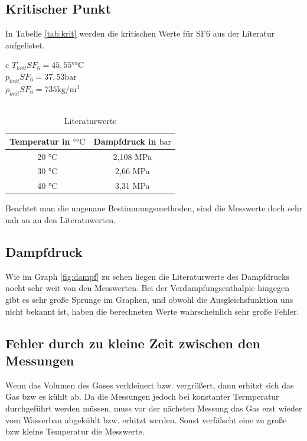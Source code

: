 \documentclass[11pt, a4paper]{article}
\begin{document}
    \subsection{Kritischer Punkt}
    In Tabelle \ref{tab:krit} werden die kritischen Werte für SF6 aus der Literatur aufgelistet.
    \begin{table}
        \centering
        \begin{tabular}{c}
            $T_{krit} SF_6 = 45,55 \si{\degree \celsius}$ \cite{SH6} \\
            $p_{krit} SF_6 = 37,53 \si{\bar}$ \cite{SH6} \\
            $\rho_{krit} SF_6 = 735 \si{\kilogram \per \meter \cubed}$ \cite{SH6} \\
            \\
            \begin{tabular}{c c}
                Temperatur in $\si{\degree\celsius}$ & Dampfdruck in $\si{\bar}$ \\ \hline
                20 \si{\celsius} & 2,108 \si{\mega\pascal} \\
                30 \si{\celsius} & 2,66 \si{\mega\pascal} \\
                40 \si{\celsius} & 3,31 \si{\mega\pascal} \\
            \end{tabular}
        \end{tabular}
        \caption{Literaturwerte}
        \label{tab:literaturwerte}
    \end{table}
    Beachtet man die ungenaue Bestimmungsmethoden, sind die Messwerte doch sehr nah an an den Literatuwerten.

    \subsection{Dampfdruck}
    Wie im Graph \ref{fig:dampf} zu sehen liegen die Literaturwerte des Dampfdrucks nocht sehr weit von den Messwerten.
    Bei der Verdampfungsenthalpie hingegen gibt es sehr große Sprunge im Graphen, und obwohl die Ausgleichsfunktion
    uns nicht bekannt ist, haben die berechneten Werte wahrscheinlich sehr große Fehler.

    \subsection{Fehler durch zu kleine Zeit zwischen den Messungen}

    Wenn das Volumen des Gases verkleinert bzw. vergrößert, dann erhitzt sich das Gas bzw es kühlt ab.
    Da die Messungen jedoch bei konstanter Termperatur durchgeführt werden müssen, muss vor 
    der nächsten Messung das Gas erst wieder vom Wasserban abgekühlt bzw. erhitzt werden. Sonst verfälscht
    eine zu große bzw kleine Temperatur die Messwerte.
    


    
    
\end{document}
